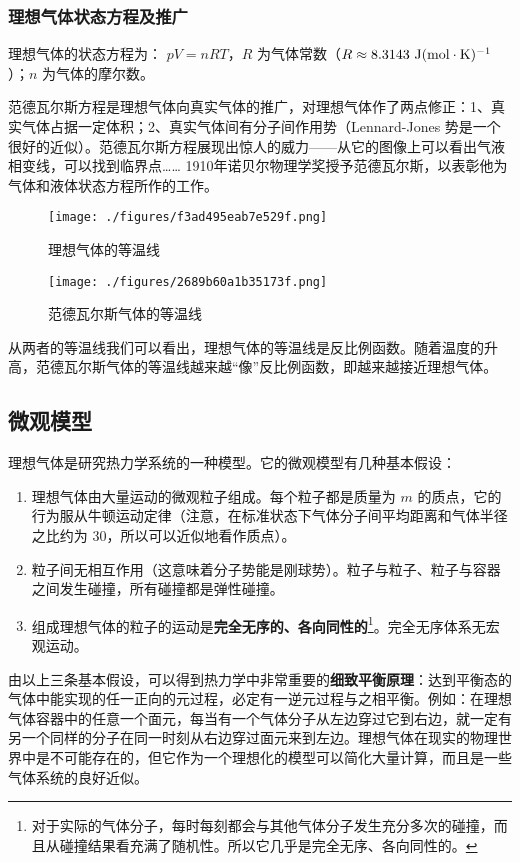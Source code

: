 \subsubsection{理想气体状态方程及推广}
理想气体的状态方程为： $pV=nRT$，$R$ 为气体常数（$R\approx 8.3143\ \rm{J}(\rm{mol\cdot K})^{-1}$）；$n$ 为气体的摩尔数。

范德瓦尔斯方程是理想气体向真实气体的推广，对理想气体作了两点修正：1、真实气体占据一定体积；2、真实气体间有分子间作用势（Lennard-Jones 势是一个很好的近似）。范德瓦尔斯方程展现出惊人的威力——从它的图像上可以看出气液相变线，可以找到临界点…… 1910年诺贝尔物理学奖授予范德瓦尔斯，以表彰他为气体和液体状态方程所作的工作。
\begin{figure}[ht]
\centering
\texttt{[image: ./figures/f3ad495eab7e529f.png]}
\caption{理想气体的等温线} \label{fig_Igas_1}
\end{figure}
\begin{figure}[ht]
\centering
\texttt{[image: ./figures/2689b60a1b35173f.png]}
\caption{范德瓦尔斯气体的等温线} \label{fig_Igas_2}
\end{figure}

从两者的等温线我们可以看出，理想气体的等温线是反比例函数。随着温度的升高，范德瓦尔斯气体的等温线越来越“像”反比例函数，即越来越接近理想气体。
\subsection{微观模型}

理想气体是研究热力学系统的一种模型。它的微观模型有几种基本假设：
\begin{enumerate}
\item 理想气体由大量运动的微观粒子组成。每个粒子都是质量为 $m$ 的质点，它的行为服从牛顿运动定律（注意，在标准状态下气体分子间平均距离和气体半径之比约为 $30$，所以可以近似地看作质点）。

\item 粒子间无相互作用（这意味着分子势能是刚球势）。粒子与粒子、粒子与容器之间发生碰撞，所有碰撞都是弹性碰撞。

\item 组成理想气体的粒子的运动是\textbf{完全无序的、各向同性的}\footnote{对于实际的气体分子，每时每刻都会与其他气体分子发生充分多次的碰撞，而且从碰撞结果看充满了随机性。所以它几乎是完全无序、各向同性的。}。完全无序体系无宏观运动。
\end{enumerate}

由以上三条基本假设，可以得到热力学中非常重要的\textbf{细致平衡原理}：达到平衡态的气体中能实现的任一正向的元过程，必定有一逆元过程与之相平衡。例如：在理想气体容器中的任意一个面元，每当有一个气体分子从左边穿过它到右边，就一定有另一个同样的分子在同一时刻从右边穿过面元来到左边。理想气体在现实的物理世界中是不可能存在的，但它作为一个理想化的模型可以简化大量计算，而且是一些气体系统的良好近似。